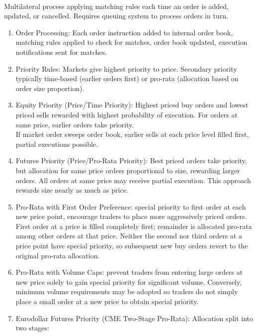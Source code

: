 
\begin{definition} \\
Multilateral process applying matching rules each time an order is added, updated, or cancelled. Requires queuing system to process orders in turn.
\begin{enumerate}[label=\roman*.]
\setlength{\itemsep}{0pt}
\item Order Processing: Each order instruction added to internal order book, matching rules applied to check for matches, order book updated, execution notifications sent for matches.
\item Priority Rules: Markets give highest priority to price. Secondary priority typically time-based (earlier orders first) or pro-rata (allocation based on order size proportion).
\item Equity Priority (Price/Time Priority): Highest priced buy orders and lowest priced sells rewarded with highest probability of execution. For orders at same price, earlier orders take priority.\\
If market order sweeps order book, earlier sells at each price level filled first, partial executions possible.
\item Futures Priority (Price/Pro-Rata Priority): Best priced orders take priority, but allocation for same price orders proportional to size, rewarding larger orders. All orders at same price may receive partial execution. This approach rewards size nearly as much as price.
\item Pro-Rata with First Order Preference: special priority to first order at each new price point, encourage traders to place more aggressively priced orders. First order at a price is filled completely first; remainder is allocated pro-rata among other orders at that price. Neither the second nor third orders at a price point have special priority, so subsequent new buy orders revert to the original pro-rata allocation.
\item Pro-Rata with Volume Caps: prevent traders from entering large orders at new price solely to gain special priority for significant volume. Conversely, minimum volume requirements may be adopted so traders do not simply place a small order at a new price to obtain special priority.
\item Eurodollar Futures Priority (CME Two-Stage Pro-Rata): Allocation split into two stages:
\begin{enumerate}[label=\arabic*.]

\end{enumerate}
\end{enumerate}
\end{definition}
